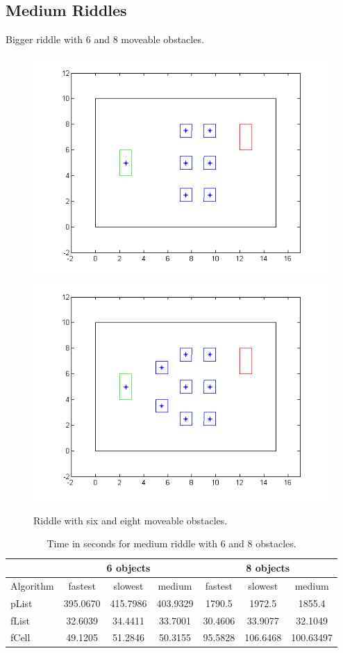 \subsection{Medium Riddles}
Bigger riddle with 6 and 8 moveable obstacles.\\
\begin{figure}[H]
\includegraphics[scale = 0.5]{riddle6}
\includegraphics[scale = 0.5]{riddle8}
\caption{Riddle with six and eight moveable obstacles.}
\end{figure}
\begin{table}[H]
\centering
\begin{tabular}{l||c|c|c||c|c|c}
& \multicolumn{3}{c||}{6 objects} &\multicolumn{3}{c}{8 objects}\\\hline\hline
Algorithm& fastest & slowest & medium & fastest & slowest & medium\\\hline
pList &  395.0670 & 415.7986 & 403.9329  & 1790.5 &1972.5 &1855.4\\
fList  &  32.6039 &  34.4411 & 33.7001 & 30.4606 & 33.9077 & 32.1049\\
fCell & 49.1205 & 51.2846 & 50.3155 & 95.5828 & 106.6468 & 100.63497\\
\end{tabular}
\caption{Time in seconds for medium riddle with 6 and 8 obstacles.}
\end{table}

